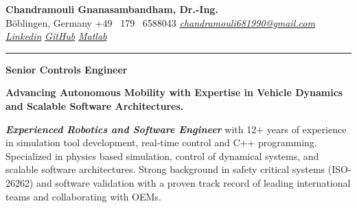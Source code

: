\documentclass[a4paper,10pt]{article}
\newcommand{\link}[1]{{\textit{#1}}}
\begin{document}
\thispagestyle{plain}

\begin{center}
    {\Large \textbf{Chandramouli Gnanasambandham, Dr.-Ing.}}\\ 
    
    \vspace{0.2cm}
    \small B\"oblingen, Germany \hfill  \bullet  \hfill  +49 \ 179 \ 6588043 \hfill \bullet  \hfill
    \textup{\href{mailto:chandramouli681990@gmail.com}{\link{chandramouli681990@gmail.com}}} \hfill \bullet \hfill
    \textup{\href{https://linkedin.com/in/ganasambandhamc}{\link{Linkedin}}} \hfill \bullet \hfill
    \textup{\href{https://github.com/chandramouli6890}{\link{GitHub}}} \hfill \bullet \hfill
    \textup{\href{https://de.mathworks.com/matlabcentral/profile/authors/4267772}{\link{Matlab}}}

    \vspace{-0.2cm}
    {\rule{\linewidth}{0.8pt}}

    \vspace{0.2cm}
    {\Large \textbf{Senior Controls Engineer}}
    
    \vspace{0.1cm}
    \colorbox{gray!40}{%
        \parbox{0.99\textwidth}{%
            \centering \textcolor{highlightcolor}{\textbf{Advancing Autonomous Mobility with Expertise in Vehicle Dynamics and Scalable Software Architectures.}}
        }%
    }
\end{center}


\noindent \textcolor{highlightcolor}{\textit{\textbf{Experienced Robotics and Software 
Engineer}}} with 12+ years of experience in simulation tool development, real-time control and C++
programming. Specialized in physics based simulation, control of dynamical systems, and scalable software
architectures. Strong background in safety critical systems (ISO-26262) and software 
validation with a proven track record of leading international teams and
collaborating with OEMs.
\end{document}
